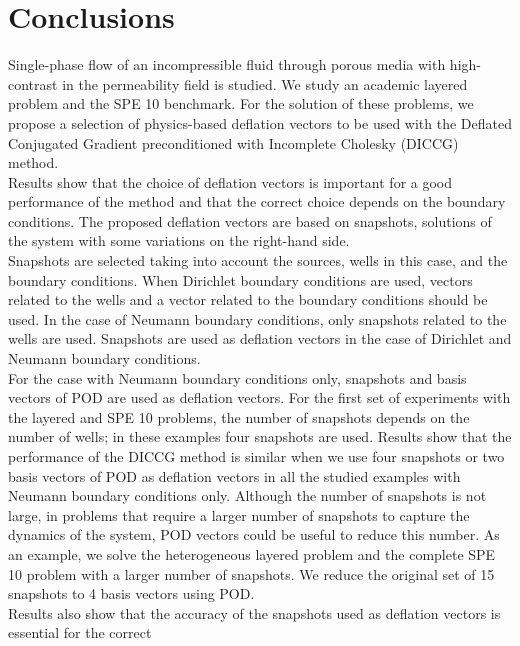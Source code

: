 \documentclass{ecmorXV}
\begin{document}
\newpage
\newpage
\section{Conclusions}
Single-phase flow of an incompressible fluid through porous media with high-contrast in
the permeability field is studied. We study an academic layered problem and the SPE 10 benchmark.
For the solution of these problems, we propose a selection of 
physics-based deflation vectors to be used with the Deflated Conjugated Gradient 
preconditioned with Incomplete Cholesky (DICCG) method.\\Results show that the 
choice of deflation vectors is important for a good performance of the method and that the correct choice
depends on the boundary conditions. 
The proposed deflation vectors are based on snapshots, solutions of the system with some variations on the 
right-hand side. 
\\ 
Snapshots are selected taking into account the sources, wells in this case, and the boundary conditions.
When Dirichlet boundary conditions are used, vectors related to the wells and a vector related to the 
boundary conditions should be used. In the case of Neumann boundary conditions, only snapshots
related to the wells are used. Snapshots are used as deflation vectors in the case of Dirichlet and Neumann 
boundary conditions. \\
For the case with Neumann boundary conditions only, snapshots and basis vectors of POD are
used as deflation vectors. For the first set of experiments with the layered and SPE 10 problems, 
the number of snapshots depends on the number 
of wells; in these examples four snapshots are used. Results show that the performance of the DICCG method is similar when we use
four snapshots or two basis vectors of POD as deflation vectors in all the studied examples with Neumann
boundary conditions only. Although the number of snapshots is not large, in problems that require a larger 
number of snapshots to capture the dynamics of the system, POD vectors could be useful
to reduce this number. As an example, we solve the heterogeneous layered problem and the complete SPE 10 problem with a 
larger number of snapshots. We reduce the 
original set of 15 snapshots to 4 basis vectors using POD.\\
Results also show that the accuracy of the snapshots used as deflation vectors is essential for the correct 
\end{document}
